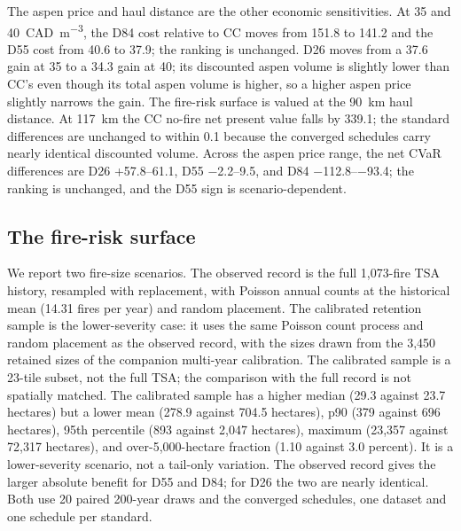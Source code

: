 The aspen price and haul distance are the other economic sensitivities. At 35 and
\SI{40}{CAD\per\cubic\meter}, the D84 cost relative to CC moves from 151.8 to
\SI{141.2}{\millionCAD} and the D55 cost from 40.6 to \SI{37.9}{\millionCAD}; the ranking is unchanged. D26 moves from a
\SI{37.6}{\millionCAD} gain at 35 to a \SI{34.3}{\millionCAD} gain at 40; its discounted aspen volume
is slightly lower than CC's even though its total aspen volume is higher, so a higher aspen price
slightly narrows the gain. The fire-risk surface is valued at the \SI{90}{\kilo\meter} haul distance. At
\SI{117}{\kilo\meter} the CC no-fire net present value falls by \SI{339.1}{\millionCAD}; the standard
differences are unchanged to within \SI{0.1}{\millionCAD} because the converged schedules carry
nearly identical discounted volume. Across the aspen price range, the net CVaR differences are D26
+\SIrange{57.8}{61.1}{\millionCAD}, D55 \SIrange{-2.2}{9.5}{\millionCAD}, and D84
\SIrange{-112.8}{-93.4}{\millionCAD}; the ranking is unchanged, and the D55 sign is scenario-dependent.

\subsection{The fire-risk surface}

We report two fire-size scenarios. The observed record is the full 1,073-fire TSA history, resampled
with replacement, with Poisson annual counts at the historical mean (14.31 fires per year) and
random placement. The calibrated retention sample is the lower-severity case: it uses the same
Poisson count process and random placement as the observed record, with the sizes drawn from the
3,450 retained sizes of the companion multi-year calibration. The calibrated sample is a 23-tile
subset, not the full TSA; the comparison with the full record is not spatially matched. The calibrated sample has a higher median (29.3 against 23.7
hectares) but a lower mean (278.9 against 704.5 hectares), p90 (379 against 696 hectares), 95th
percentile (893 against 2,047 hectares), maximum (23,357 against 72,317 hectares), and
over-5,000-hectare fraction (1.10 against 3.0 percent). It is a lower-severity scenario, not a
tail-only variation. The observed record gives the larger absolute benefit for D55 and D84; for D26 the two are nearly identical. Both use 20 paired 200-year draws and
the converged schedules, one dataset and one schedule per standard.

